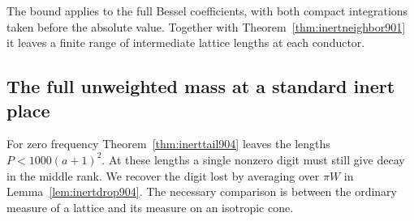 \documentclass[a4paper,11pt]{article}
\theoremstyle{definition}
\theoremstyle{remark}
\numberwithin{equation}{section}
\begin{document}
The bound applies to the full Bessel coefficients, with both
compact integrations taken before the absolute value. Together
with Theorem~\ref{thm:inertneighbor901} it leaves a finite
range of intermediate lattice lengths at each conductor.
\clearpage

\subsection{The full unweighted mass at a standard inert place}
\label{sec:inertzero905}

For zero frequency Theorem~\ref{thm:inerttail904} leaves the
lengths \(P<1000(a+1)^2\). At these lengths a single
nonzero digit must still give decay in the middle rank. We
recover the digit lost by averaging over \(\pi W\) in
Lemma~\ref{lem:inertdrop904}. The necessary comparison
is between the ordinary measure of a lattice and its measure
on an isotropic cone.
\end{document}
